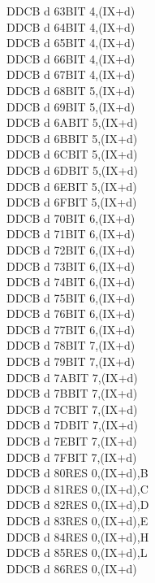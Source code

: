 \begin{multicols}{3}
{\begin{tabbing}
	DDCB d 63\>BIT 4,(IX+d)\UNDOC\\
	DDCB d 64\>BIT 4,(IX+d)\UNDOC\\
	DDCB d 65\>BIT 4,(IX+d)\UNDOC\\
	DDCB d 66\>BIT 4,(IX+d)\\
	DDCB d 67\>BIT 4,(IX+d)\UNDOC\\
	DDCB d 68\>BIT 5,(IX+d)\UNDOC\\
	DDCB d 69\>BIT 5,(IX+d)\UNDOC\\
	DDCB d 6A\>BIT 5,(IX+d)\UNDOC\\
	DDCB d 6B\>BIT 5,(IX+d)\UNDOC\\
	DDCB d 6C\>BIT 5,(IX+d)\UNDOC\\
	DDCB d 6D\>BIT 5,(IX+d)\UNDOC\\
	DDCB d 6E\>BIT 5,(IX+d)\\
	DDCB d 6F\>BIT 5,(IX+d)\UNDOC\\
	DDCB d 70\>BIT 6,(IX+d)\UNDOC\\
	DDCB d 71\>BIT 6,(IX+d)\UNDOC\\
	DDCB d 72\>BIT 6,(IX+d)\UNDOC\\
	DDCB d 73\>BIT 6,(IX+d)\UNDOC\\
	DDCB d 74\>BIT 6,(IX+d)\UNDOC\\
	DDCB d 75\>BIT 6,(IX+d)\UNDOC\\
	DDCB d 76\>BIT 6,(IX+d)\\
	DDCB d 77\>BIT 6,(IX+d)\UNDOC\\
	DDCB d 78\>BIT 7,(IX+d)\UNDOC\\
	DDCB d 79\>BIT 7,(IX+d)\UNDOC\\
	DDCB d 7A\>BIT 7,(IX+d)\UNDOC\\
	DDCB d 7B\>BIT 7,(IX+d)\UNDOC\\
	DDCB d 7C\>BIT 7,(IX+d)\UNDOC\\
	DDCB d 7D\>BIT 7,(IX+d)\UNDOC\\
	DDCB d 7E\>BIT 7,(IX+d)\\
	DDCB d 7F\>BIT 7,(IX+d)\UNDOC\\
	DDCB d 80\>RES 0,(IX+d),B\UNDOC\\
	DDCB d 81\>RES 0,(IX+d),C\UNDOC\\
	DDCB d 82\>RES 0,(IX+d),D\UNDOC\\
	DDCB d 83\>RES 0,(IX+d),E\UNDOC\\
	DDCB d 84\>RES 0,(IX+d),H\UNDOC\\
	DDCB d 85\>RES 0,(IX+d),L\UNDOC\\
	DDCB d 86\>RES 0,(IX+d)\\

\end{tabbing}}
\end{multicols}

